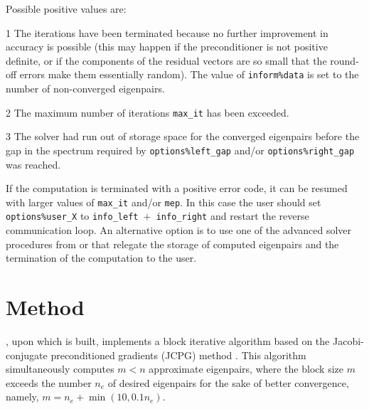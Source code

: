 \noindent
Possible positive values  are: 
%
\begin{description}
\item{1}
\hskip 9pt
The iterations have been terminated because no further improvement
in accuracy is possible (this may happen if the preconditioner is
not positive definite, or if the components of the residual vectors
are so small that the round-off
errors make them essentially random).
The value of {\tt inform\%data} is set to the number
of non-converged eigenpairs.
\item{2}
\hskip 9pt
The maximum number of iterations {\tt max\_it} has been exceeded.
\item{3}
\hskip 9pt
The solver had run
out of storage space for the converged eigenpairs
before the gap in the spectrum 
required by {\tt options\%left\_gap} and/or {\tt options\%right\_gap}
was reached.
%
\end{description}

If the computation is terminated with a positive error code,
it can be resumed with larger values of {\tt max\_it} and/or {\tt mep}.
In this case the user should set {\tt options\%user\_X} to
{\tt info\_left $+$ info\_right}
and restart the reverse communication loop.
An alternative option is to use
one of the advanced solver procedures
from {\tt \advanced} or {\tt \engine}
that relegate the storage of computed eigenpairs and
the termination of the computation to the user.

\section{Method}
\label{sec:method}

{\tt \engine}, upon which {\tt\fullpackagename} is built,
implements a block iterative algorithm
based on the Jacobi-conjugate preconditioned gradients (JCPG) method
\cite{jcpg1,jcpg2}.
This algorithm simultaneously computes $m < n$ approximate eigenpairs,
where the block size $m$ exceeds the number $n_e$ of desired eigenpairs
for the sake of better convergence, namely,
$m = n_e + \min(10, 0.1 n_e)$.


